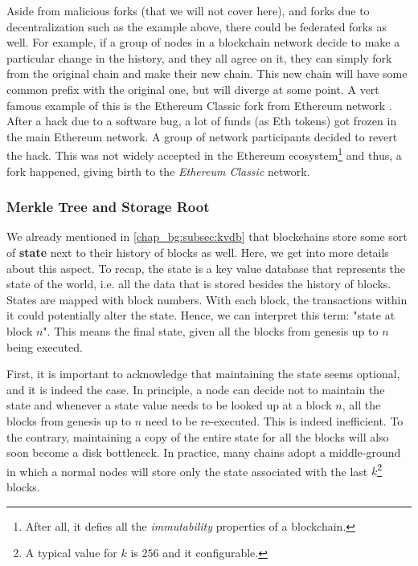 Aside from malicious forks (that we will not cover here), and forks due to decentralization such as
the example above, there could be federated forks as well. For example, if a group of nodes in a
blockchain network decide to make a particular change in the history, and they all agree on it, they
can simply fork from the original chain and make their new chain. This new chain will have some
common prefix with the original one, but will diverge at some point. A vert famous example of this
is the Ethereum Classic fork from Ethereum network \cite{dao_hack}. After a hack due to a software
bug, a lot of funds (as Eth tokens) got frozen in the main Ethereum network. A group of
network participants decided to revert the hack. This was not widely accepted in the Ethereum
ecosystem\footnote{After all, it defies all the \textit{immutability} properties of a blockchain.}
and thus, a fork happened, giving birth to the \textit{Ethereum Classic} network.


\subsubsection{Merkle Tree and Storage Root} \label{chap_bg:subsec:trie}

We already mentioned in \ref{chap_bg:subsec:kvdb} that blockchains store some sort of \textbf{state}
next to their history of blocks as well. Here, we get into more details about this aspect. To recap,
the state is a key value database that represents the state of the world, i.e. all the data that is
stored besides the history of blocks. States are mapped with block numbers. With each block, the
transactions within it could potentially alter the state. Hence, we can interpret this term: "state
at block $n$". This means the final state, given all the blocks from genesis up to $n$ being
executed.

First, it is important to acknowledge that maintaining the state seems optional, and it is indeed
the case. In principle, a node can decide not to maintain the state and whenever a state value needs
to be looked up at a block $n$, all the blocks from genesis up to $n$ need to be re-executed. This
is indeed inefficient. To the contrary, maintaining a copy of the entire state for all the blocks
will also soon become a disk bottleneck. In practice, many chains adopt a middle-ground in which a
normal nodes will store only the state associated with the last $k$\footnote{A typical value for $k$
is $256$ and it configurable.} blocks.

